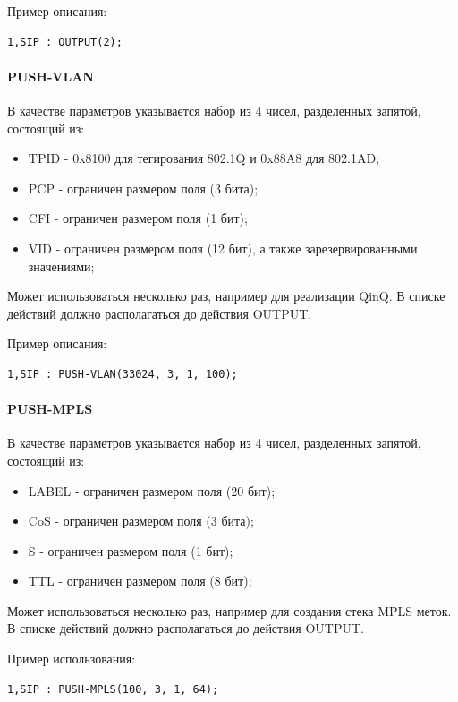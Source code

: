 Пример описания:
\begin{lstlisting}
1,SIP : OUTPUT(2);
\end{lstlisting}

\paragraph{PUSH-VLAN}

В качестве параметров указывается набор из 4 чисел, разделенных запятой, состоящий из:
\begin{itemize}
\item TPID - 0x8100 для тегирования 802.1Q и 0x88A8 для 802.1AD;
\item PCP - ограничен размером поля (3 бита);
\item CFI - ограничен размером поля (1 бит);
\item VID - ограничен размером поля (12 бит), а также зарезервированными значениями;
\end{itemize}

Может использоваться несколько раз, например для реализации QinQ. В списке действий должно располагаться до действия OUTPUT.

Пример описания:
\begin{lstlisting}
1,SIP : PUSH-VLAN(33024, 3, 1, 100);
\end{lstlisting}

\paragraph{PUSH-MPLS}

В качестве параметров указывается набор из 4 чисел, разделенных запятой, состоящий из:
\begin{itemize}
\item LABEL - ограничен размером поля (20 бит);
\item CoS - ограничен размером поля (3 бита);
\item S - ограничен размером поля (1 бит);
\item TTL - ограничен размером поля (8 бит);
\end{itemize}

Может использоваться несколько раз, например для создания стека MPLS меток. В списке действий должно располагаться до действия OUTPUT.

Пример использования:
\begin{lstlisting}
1,SIP : PUSH-MPLS(100, 3, 1, 64);
\end{lstlisting}
